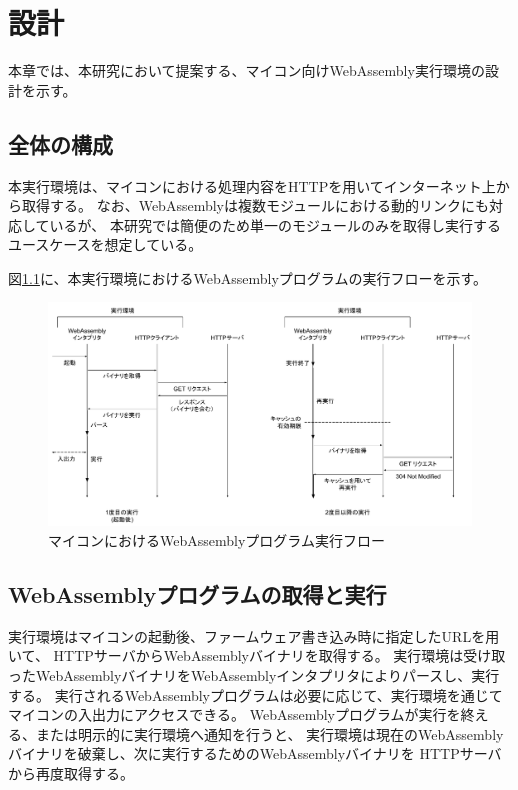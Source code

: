 \chapter{設計}
\label{chap:design}

本章では、本研究において提案する、マイコン向けWebAssembly実行環境の設計を示す。

\section{全体の構成}

本実行環境は、マイコンにおける処理内容をHTTPを用いてインターネット上から取得する。
なお、WebAssemblyは複数モジュールにおける動的リンクにも対応しているが、
本研究では簡便のため単一のモジュールのみを取得し実行するユースケースを想定している。

図\ref{fig:wasm_design}に、本実行環境におけるWebAssemblyプログラムの実行フローを示す。

\begin{figure}[htbp]
  \caption{マイコンにおけるWebAssemblyプログラム実行フロー}
  \label{fig:wasm_design}
  \begin{center}
    \includegraphics[bb=0 0 1000 530,width=15cm]{img/wasm_design.pdf}
  \end{center}
\end{figure}

\section{WebAssemblyプログラムの取得と実行}

実行環境はマイコンの起動後、ファームウェア書き込み時に指定したURLを用いて、
HTTPサーバからWebAssemblyバイナリを取得する。
実行環境は受け取ったWebAssemblyバイナリをWebAssemblyインタプリタによりパースし、実行する。
実行されるWebAssemblyプログラムは必要に応じて、実行環境を通じてマイコンの入出力にアクセスできる。
WebAssemblyプログラムが実行を終える、または明示的に実行環境へ通知を行うと、
実行環境は現在のWebAssemblyバイナリを破棄し、次に実行するためのWebAssemblyバイナリを
HTTPサーバから再度取得する。

